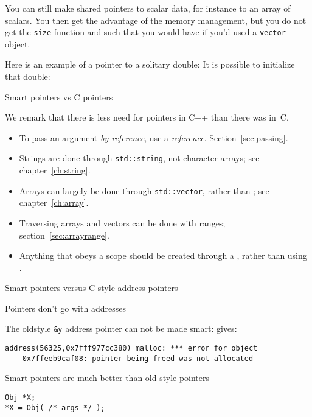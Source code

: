 You can still make shared pointers to scalar data, for instance to an
array of scalars. You then get the advantage of the memory management,
but you do not get the \lstinline{size} function and such that you would have
if you'd used a \lstinline{vector} object.

Here is an example of a pointer to a solitary double:
%
%
It is possible to initialize that double:
%

 {Smart pointers vs C pointers}

We remark that there is less need for pointers in C++
than there was in~C.

\begin{itemize}
\item To pass an argument
  \emph{by reference},
  use a \emph{reference}.
  Section~\ref{sec:passing}.
\item Strings are done through \lstinline{std::string}, not character arrays;
  see chapter~\ref{ch:string}.
\item Arrays can largely be done through \lstinline{std::vector}, rather than
  ; see chapter~\ref{ch:array}.
\item Traversing arrays and vectors can be done with ranges;
  section~\ref{sec:arrayrange}.
\item Anything that obeys a scope should be created through a
  , rather than using .
\end{itemize}

 {Smart pointers versus C-style address pointers}

\begin{block}{Pointers don't go with addresses}
  \label{sl:shareaddress}

  The oldstyle \lstinline{&y} address pointer can not be made smart:
  gives:
  {\small
\begin{verbatim}
address(56325,0x7fff977cc380) malloc: *** error for object
    0x7ffeeb9caf08: pointer being freed was not allocated
\end{verbatim}
}
\end{block}

Smart pointers are much better than old style pointers
\begin{lstlisting}
Obj *X;
*X = Obj( /* args */ );
\end{lstlisting}

